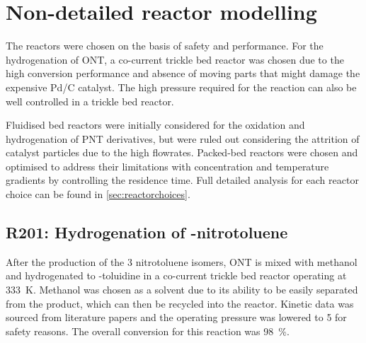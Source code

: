 \section{Non-detailed reactor modelling} \label{Non-detailed}

The reactors were chosen on the basis of safety and performance. For the hydrogenation of ONT, a co-current trickle bed reactor was chosen due to the high conversion performance and absence of moving parts that might damage the expensive Pd/C catalyst. The high pressure required for the reaction can also be well controlled in a trickle bed reactor. 

Fluidised bed reactors were initially considered for the oxidation and hydrogenation of PNT derivatives, but were ruled out considering the attrition of catalyst particles due to the high flowrates. Packed-bed reactors were chosen and optimised to address their limitations with concentration and temperature gradients by controlling the residence time. Full detailed analysis for each reactor choice can be found in \cref{sec:reactorchoices}.

\begin{table}[h]
\centering
\caption{Summary of non-detailed reactors}
\label{tab:nondetailedtable}
\end{table}

\subsection{R201: Hydrogenation of \ortho-nitrotoluene}
After the production of the 3 nitrotoluene isomers, ONT is mixed with methanol and hydrogenated to \ortho-toluidine in a co-current trickle bed reactor operating at \SI{333}{\K}. Methanol was chosen as a solvent due to its ability to be easily separated from the product, which can then be recycled into the reactor. Kinetic data was sourced from literature papers \cite{rajadhyaksha_solvent_1986} and the operating pressure was lowered to \SI{5}{\atm} for safety reasons. The overall conversion for this reaction was \SI{98}{\%}.


